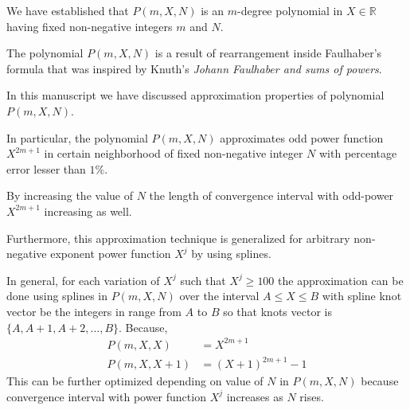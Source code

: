 We have established that $P(m, X, N)$ is an $m$-degree polynomial in $X\in\mathbb{R}$
having fixed non-negative integers $m$ and $N$.

The polynomial $P(m, X, N)$ is a result of rearrangement inside Faulhaber's formula that
was inspired by Knuth's \textit{Johann Faulhaber and sums of powers}.

In this manuscript we have discussed approximation properties of polynomial $P(m,X,N)$.

In particular, the polynomial $P(m,X,N)$ approximates odd power function $X^{2m+1}$ in certain neighborhood
of fixed non-negative integer $N$ with percentage error lesser than $1\%$.

By increasing the value of $N$ the length of convergence interval with odd-power $X^{2m+1}$ increasing as well.

Furthermore, this approximation technique is generalized for arbitrary non-negative exponent power function $X^j$
by using splines.

In general, for each variation of $X^j$ such that $X^j \geq 100$ the approximation can be done using
splines in $P(m,X, N)$ over the interval $A \leq X \leq B$ with spline knot vector be the integers in
range from $A$ to $B$ so that knots vector is $\{A, A+1, A+2, \ldots, B \}$.
Because,
\begin{align*}
    P(m,X, X) &= X^{2m+1} \\
    P(m,X, X+1) &= (X+1)^{2m+1} - 1
\end{align*}
This can be further optimized depending on value of $N$ in $P(m,X,N)$ because convergence interval
with power function $X^j$ increases as $N$ rises.
